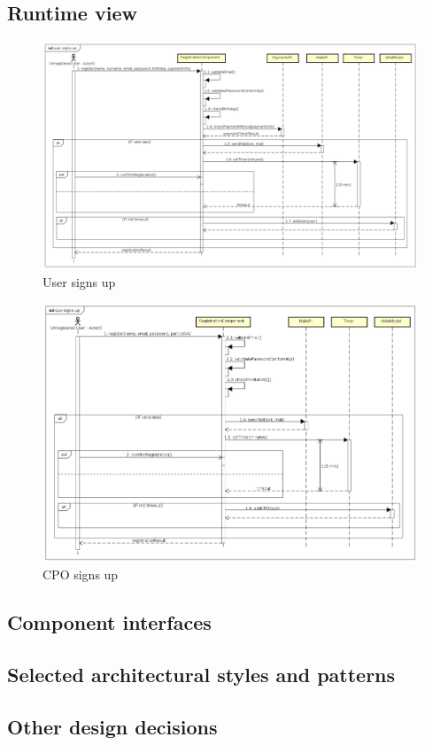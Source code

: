 \subsection{Runtime view}
\begin{figure}[!h]
    \begin{center}
        \includegraphics[keepaspectratio, width=16cm]{Sequence/user-signs-up.png}
        \caption{User signs up}
        \label{fig:user-signs-up}
    \end{center}
\end{figure}
\begin{figure}[!h]
    \begin{center}
        \includegraphics[keepaspectratio, width=16cm]{Sequence/cpo-signs-up.png}
        \caption{\ac{CPO} signs up}
        \label{fig:cpo-signs-up}
    \end{center}
\end{figure}
\clearpage
\subsection{Component interfaces}
\subsection{Selected architectural styles and patterns}
\subsection{Other design decisions}
\clearpage